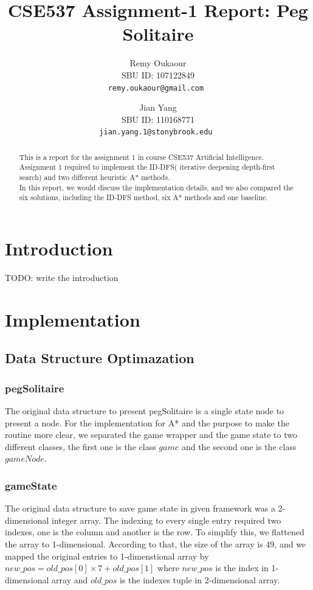 \documentclass[11pt,letter]{article}
\title{CSE537 Assignment-1 Report: Peg Solitaire}
\author{
Remy Oukaour \\
       {\small SBU ID: 107122849}\\
       {\small \texttt{remy.oukaour@gmail.com }}
\and
Jian Yang \\
       {\small SBU ID: 110168771}\\
       {\small \texttt{jian.yang.1@stonybrook.edu }}
}
\date{}
\begin{document}
\maketitle

\begin{abstract}
This is a report for the assignment 1 in course CSE537 Artificial Intelligence. Assignment 1 required to implement the ID-DFS( iterative deepening depth-first search) and two different heuristic A* methods. \\
In this report, we would discuss the implementation details, and we also compared the six solutions, including the ID-DFS method, six A* methods and one baseline.
\end{abstract}


\section{Introduction}
TODO: write the introduction

\section {Implementation}\label{sec:var}
\subsection {Data Structure Optimazation}
\subsubsection {pegSolitaire}
The original data structure to present pegSolitaire is a single state node to present a node. For the implementation for A* and the purpose to make the routine more clear, we separated the game wrapper and the game state to two different classes, the first one is the class \(game\) and the second one is the class \(gameNode\).
\subsubsection {gameState}
The original data structure to save game state in given framework was a 2-dimensional integer array. The indexing to every single entry required two indexes, one is the column and another is the row. To simplify this, we flattened the array to 1-dimensional. According to that, the size of the array is 49, and we mapped the original entries to 1-dimenstional array by \(new\_pos = old\_pos[0] \times 7 + old\_pos[1]\) where \(new\_pos\) is the index in 1-dimensional array and \(old\_pos\) is the indexes tuple in 2-dimensional array. 
\end{document}
